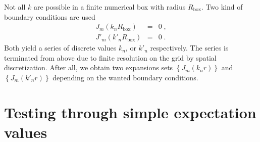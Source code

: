 \documentclass[12pt]{article}
\begin{document}
Not all $k$ are possible in a finite numerical box with radius
$R_\mathrm{box}$. Two kind of boundary conditions are used
\begin{subequations}
\begin{eqnarray}
  J_m(k_nR_\mathrm{box})
  &=&
  0
  \;,
\\
  J'_m(k'_nR_\mathrm{box})
  &=&
  0
  \;.
\end{eqnarray}
\end{subequations}
Both yield a series of discrete values $k_n$, or $k'_n$ respectively.
The series is terminated from above due to finite resolution on the
grid by spatial discretization. 
After all, we obtain two expansions sets $\left\{J_m(k_nr)\right\}$ and
$\left\{J_m(k'_nr)\right\}$ depending on the wanted boundary conditions.

\section{Testing through simple expectation values}
\end{document}
